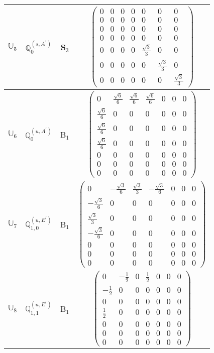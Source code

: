 \documentclass[fleqn,10pt,landscape]{article}
\begin{document}
\begin{itemize}
\begin{center}
\begin{longtable}{c|c|c|c}
$ \mathbb{U}_{5} $ & $\mathbb{Q}_{0}^{(s,A^{\prime})}$ & S$_{3}$ & $\begin{pmatrix} 0 & 0 & 0 & 0 & 0 & 0 & 0 \\ 0 & 0 & 0 & 0 & 0 & 0 & 0 \\ 0 & 0 & 0 & 0 & 0 & 0 & 0 \\ 0 & 0 & 0 & 0 & 0 & 0 & 0 \\ 0 & 0 & 0 & 0 & \frac{\sqrt{3}}{3} & 0 & 0 \\ 0 & 0 & 0 & 0 & 0 & \frac{\sqrt{3}}{3} & 0 \\ 0 & 0 & 0 & 0 & 0 & 0 & \frac{\sqrt{3}}{3} \end{pmatrix}$ \\ \hline
$ \mathbb{U}_{6} $ & $\mathbb{Q}_{0}^{(u,A^{\prime})}$ & B$_{1}$ & $\begin{pmatrix} 0 & \frac{\sqrt{6}}{6} & \frac{\sqrt{6}}{6} & \frac{\sqrt{6}}{6} & 0 & 0 & 0 \\ \frac{\sqrt{6}}{6} & 0 & 0 & 0 & 0 & 0 & 0 \\ \frac{\sqrt{6}}{6} & 0 & 0 & 0 & 0 & 0 & 0 \\ \frac{\sqrt{6}}{6} & 0 & 0 & 0 & 0 & 0 & 0 \\ 0 & 0 & 0 & 0 & 0 & 0 & 0 \\ 0 & 0 & 0 & 0 & 0 & 0 & 0 \\ 0 & 0 & 0 & 0 & 0 & 0 & 0 \end{pmatrix}$ \\
$ \mathbb{U}_{7} $ & $\mathbb{Q}_{1,0}^{(u,E^{\prime})}$ & B$_{1}$ & $\begin{pmatrix} 0 & - \frac{\sqrt{3}}{6} & \frac{\sqrt{3}}{3} & - \frac{\sqrt{3}}{6} & 0 & 0 & 0 \\ - \frac{\sqrt{3}}{6} & 0 & 0 & 0 & 0 & 0 & 0 \\ \frac{\sqrt{3}}{3} & 0 & 0 & 0 & 0 & 0 & 0 \\ - \frac{\sqrt{3}}{6} & 0 & 0 & 0 & 0 & 0 & 0 \\ 0 & 0 & 0 & 0 & 0 & 0 & 0 \\ 0 & 0 & 0 & 0 & 0 & 0 & 0 \\ 0 & 0 & 0 & 0 & 0 & 0 & 0 \end{pmatrix}$ \\
$ \mathbb{U}_{8} $ & $\mathbb{Q}_{1,1}^{(u,E^{\prime})}$ & B$_{1}$ & $\begin{pmatrix} 0 & - \frac{1}{2} & 0 & \frac{1}{2} & 0 & 0 & 0 \\ - \frac{1}{2} & 0 & 0 & 0 & 0 & 0 & 0 \\ 0 & 0 & 0 & 0 & 0 & 0 & 0 \\ \frac{1}{2} & 0 & 0 & 0 & 0 & 0 & 0 \\ 0 & 0 & 0 & 0 & 0 & 0 & 0 \\ 0 & 0 & 0 & 0 & 0 & 0 & 0 \\ 0 & 0 & 0 & 0 & 0 & 0 & 0 \end{pmatrix}$ \\

\end{longtable}
\end{center}
\end{itemize}
\end{document}

